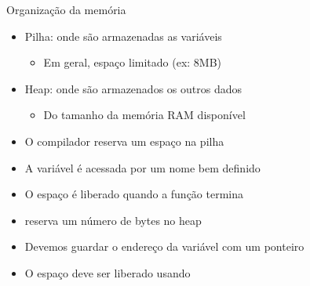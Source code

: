 \documentclass{beamer}
\begin{document}
\begin{frame}[<+->]{Organização da memória}
  \begin{itemize}
    \item \alert{Pilha:} onde são armazenadas as variáveis
      \begin{itemize}
        \item Em geral, espaço limitado (ex: 8MB)
      \end{itemize}
    \item \alert{Heap:} onde são armazenados os outros dados
      \begin{itemize}
        \item Do tamanho da memória RAM disponível
      \end{itemize}
  \end{itemize}

  \medskip

  \begin{itemize}
    \item O compilador reserva um espaço na pilha
    \item A variável é acessada por um nome bem definido
    \item O espaço é liberado quando a função termina
  \end{itemize}

  \medskip

  \begin{itemize}
    \item \alert{} reserva um número de bytes no heap
    \item Devemos guardar o endereço da variável com um ponteiro
    \item O espaço deve ser liberado usando \alert{}
  \end{itemize}
\end{frame}
\end{document}
